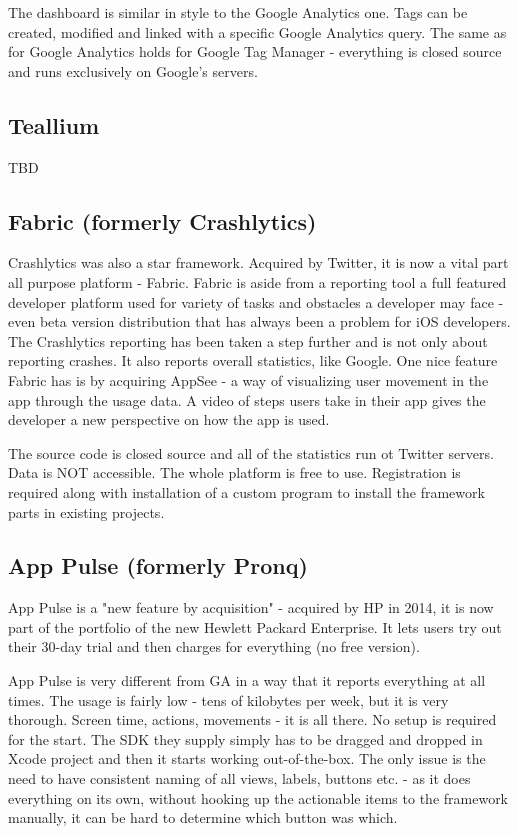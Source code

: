 The dashboard is similar in style to the Google Analytics one. Tags can be created, modified and linked with a specific Google Analytics query. The same as for Google Analytics holds for Google Tag Manager - everything is closed source and runs exclusively on Google's servers.

\subsection{Teallium}

TBD

\subsection{Fabric (formerly Crashlytics)}

Crashlytics was also a star framework. Acquired by Twitter, it is now a vital part all purpose platform - Fabric. Fabric is aside from a reporting tool a full featured developer platform used for variety of tasks and obstacles a developer may face - even beta version distribution that has always been a problem for iOS developers. The Crashlytics reporting has been taken a step further and is not only about reporting crashes. It also reports overall statistics, like Google. One nice feature Fabric has is by acquiring AppSee - a way of visualizing user movement in the app through the usage data. A video of steps users take in their app gives the developer a new perspective on how the app is used.

The source code is closed source and all of the statistics run ot Twitter servers. Data is NOT accessible. The whole platform is free to use. Registration is required along with installation of a custom program to install the framework parts in existing projects.


\subsection{App Pulse (formerly Pronq)}

App Pulse is a "new feature by acquisition" - acquired by HP in 2014, it is now part of the portfolio of the new Hewlett Packard Enterprise. It lets users try out their 30-day trial and then charges for everything (no free version).

App Pulse is very different from GA in a way that it reports everything at all times. The usage is fairly low - tens of kilobytes per week, but it is very thorough. Screen time, actions, movements - it is all there. No setup is required for the start. The SDK they supply simply has to be dragged and dropped in Xcode project and then it starts working out-of-the-box. The only issue is the need to have consistent naming of all views, labels, buttons etc. - as it does everything on its own, without hooking up the actionable items to the framework manually, it can be hard to determine which button was which.

